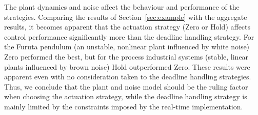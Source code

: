 The plant dynamics and noise affect the behaviour and performance of the strategies.
Comparing the results of Section~\ref{sec:example} with the aggregate results, it becomes apparent that the actuation strategy (Zero or Hold) affects control performance significantly more than the deadline handling strategy.
For the Furuta pendulum (an unstable, nonlinear plant influenced by white noise) Zero performed the best, but for the process industrial systems (stable, linear plants influenced by brown noise) Hold outperformed Zero.
These results were apparent even with no consideration taken to the deadline handling strategies.
Thus, we conclude that the plant and noise model should be the ruling factor when choosing the actuation strategy, while the deadline handling strategy is mainly limited by the constraints imposed by the real-time implementation.
